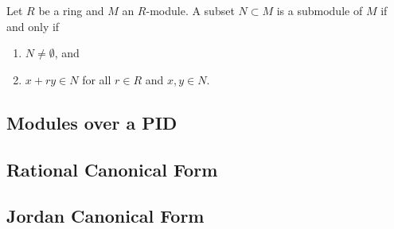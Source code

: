  \begin{theorem}
    Let $R$ be a ring and $M$ an $R$-module. A subset $N \subset M$ is a submodule of $M$ if and only if 
    \begin{enumerate}
      \item $N \neq \emptyset$, and 
      \item $x + ry \in N$ for all $r \in R$ and $x, y \in N$. 
    \end{enumerate}
  \end{theorem}

\subsection{Modules over a PID} 

\subsection{Rational Canonical Form}

\subsection{Jordan Canonical Form}

